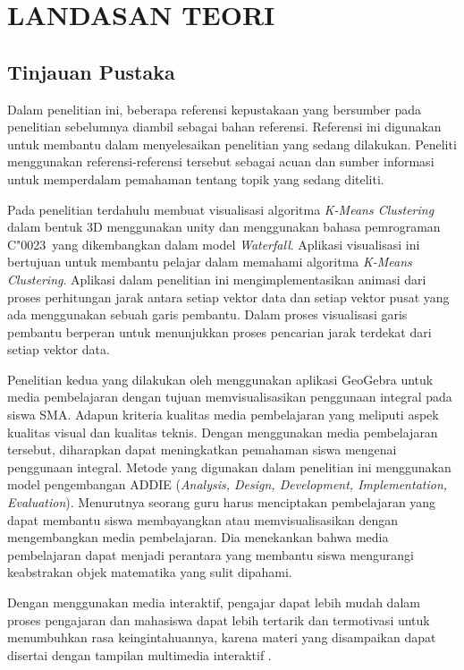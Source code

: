 \chapter{LANDASAN TEORI}
\section{Tinjauan Pustaka}
Dalam penelitian ini, beberapa referensi kepustakaan yang bersumber pada penelitian sebelumnya diambil sebagai bahan referensi. Referensi ini digunakan untuk membantu dalam menyelesaikan penelitian yang sedang dilakukan. Peneliti menggunakan referensi-referensi tersebut sebagai acuan dan sumber informasi untuk memperdalam pemahaman tentang topik yang sedang diteliti.

Pada penelitian terdahulu \textcite{suryadibrata2020visualisasi} membuat visualisasi algoritma \textit{K-Means Clustering} dalam bentuk 3D menggunakan unity dan menggunakan bahasa pemrograman C\char"0023\ yang dikembangkan dalam model \textit{Waterfall}. Aplikasi visualisasi ini bertujuan untuk membantu pelajar dalam memahami algoritma \textit{K-Means Clustering}. Aplikasi dalam penelitian ini mengimplementasikan animasi dari proses perhitungan jarak antara setiap vektor data dan setiap vektor pusat yang ada menggunakan sebuah garis pembantu. Dalam proses visualisasi garis pembantu berperan untuk menunjukkan proses pencarian jarak terdekat dari setiap vektor data.

Penelitian kedua yang dilakukan oleh \textcite{zarkasyi2015pengembangan} menggunakan aplikasi GeoGebra untuk media pembelajaran dengan tujuan memvisualisasikan penggunaan integral pada siswa SMA. Adapun kriteria kualitas media pembelajaran yang meliputi aspek kualitas visual dan kualitas teknis. Dengan menggunakan media pembelajaran tersebut, diharapkan dapat meningkatkan pemahaman siswa mengenai penggunaan integral. Metode yang digunakan dalam penelitian ini menggunakan model pengembangan ADDIE (\textit{Analysis, Design, Development, Implementation, Evaluation}). Menurutnya seorang guru harus menciptakan pembelajaran yang dapat membantu siswa membayangkan atau memvisualisasikan dengan mengembangkan media pembelajaran. Dia menekankan bahwa media pembelajaran dapat menjadi perantara yang membantu siswa mengurangi keabstrakan objek matematika yang sulit dipahami.

Dengan menggunakan media interaktif, pengajar dapat lebih mudah dalam proses pengajaran dan mahasiswa dapat lebih tertarik dan termotivasi untuk menumbuhkan rasa keingintahuannya, karena materi yang disampaikan dapat disertai dengan tampilan multimedia interaktif \cite{maulana2021penerapan}.

